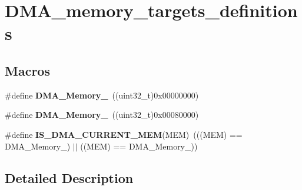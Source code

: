 \hypertarget{group___d_m_a__memory__targets__definitions}{\section{D\-M\-A\-\_\-memory\-\_\-targets\-\_\-definitions}
\label{group___d_m_a__memory__targets__definitions}
}
\subsection*{Macros}
\begin{DoxyCompactItemize}
\item 
\hypertarget{group___d_m_a__memory__targets__definitions_gadb576bccef5f2fc65fe9b451033bdc95}{\#define {\bfseries D\-M\-A\-\_\-\-Memory\-\_}~((uint32\-\_\-t)0x00000000)}\label{group___d_m_a__memory__targets__definitions_gadb576bccef5f2fc65fe9b451033bdc95}

\item 
\hypertarget{group___d_m_a__memory__targets__definitions_ga6d1e13631e4ef9a013d078e613fd7fd5}{\#define {\bfseries D\-M\-A\-\_\-\-Memory\-\_}~((uint32\-\_\-t)0x00080000)}\label{group___d_m_a__memory__targets__definitions_ga6d1e13631e4ef9a013d078e613fd7fd5}

\item 
\hypertarget{group___d_m_a__memory__targets__definitions_ga87d6abab18d2b4bb86db909854cc1f02}{\#define {\bfseries I\-S\-\_\-\-D\-M\-A\-\_\-\-C\-U\-R\-R\-E\-N\-T\-\_\-\-M\-E\-M}(M\-E\-M)~(((M\-E\-M) == D\-M\-A\-\_\-\-Memory\-\_) $|$$|$ ((M\-E\-M) == D\-M\-A\-\_\-\-Memory\-\_))}\label{group___d_m_a__memory__targets__definitions_ga87d6abab18d2b4bb86db909854cc1f02}

\end{DoxyCompactItemize}


\subsection{Detailed Description}
